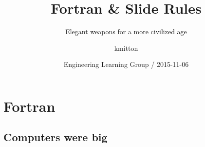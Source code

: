 \documentclass{beamer}
\title
{Fortran \& Slide Rules}
\subtitle
{Elegant weapons for a more civilized age} %
\author[Mitton] %
{kmitton}
\institute[Yelp] %
{
  Yelp
}
\date[Engineering Learning Group 2015] %
{Engineering Learning Group / 2015-11-06}
\begin{document}
\begin{frame}
  \titlepage
\end{frame}



\section{Fortran}

\subsection{Computers were big}


\begin{frame}[plain]
    \begin{centering}
        \par
    \end{centering}
\end{frame}


\begin{frame}[plain]
    \begin{centering}
        \par
    \end{centering}
\end{frame}

\begin{frame}[plain]
    \begin{centering}
        \par
    \end{centering}
\end{frame}
\end{document}
